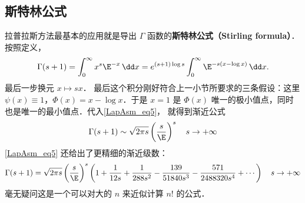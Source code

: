 \subsection{斯特林公式}
拉普拉斯方法最基本的应用就是导出 $\Gamma$ 函数的\textbf{斯特林公式（Stirling formula）}． 按照定义，
\[
  \Gamma(s+1)
  =\int_0^\infty x^s\E^{-x}\,\dd x
  =e^{(s+1)\log s}\int_0^\infty \E^{-s(x-\log x)}\,\dd x.
\]
最后一步换元 $x\mapsto sx$． 最后这个积分刚好符合上一小节所要求的三条假设：这里 $\psi(x)\equiv1$，$\Phi(x)=x-\log x$．于是 $x=1$ 是 $\Phi(x)$ 唯一的极小值点，同时也是唯一的最小值点．代入\autoref{LapAsm_eq5}， 就得到渐近公式
\[
  \Gamma(s+1)\sim\sqrt{2\pi s}\left(\frac{s}{\E}\right)^s\quad s\to+\infty
\]
\autoref{LapAsm_eq5} 还给出了更精细的渐近级数：
\[
  \Gamma(s+1)
  =\sqrt{2\pi s}\left({s\over \E}\right)^s
  \left(
   1
   +{1\over12s}
   +{1\over288 s^2}
   -{139\over51840 s^3}
   -{571\over2488320 s^4}
   + \cdots
  \right)\quad s\to+\infty
\]
毫无疑问这是一个可以对大的 $n$ 来近似计算 $n!$ 的公式．
